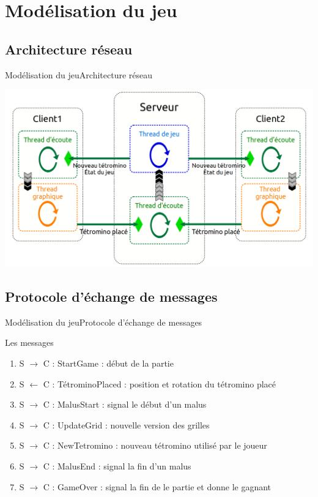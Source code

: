 \documentclass[french]{beamer}
\begin{document}
\section{Modélisation du jeu}
	\subsection{Architecture réseau}

		\begin{frame}{Modélisation du jeu}{Architecture réseau}
			\begin{center}
				\includegraphics[scale=0.25]{img/archi_reseau.png}
			\end{center}
		\end{frame}

	\subsection{Protocole d'échange de messages}

		\begin{frame}{Modélisation du jeu}{Protocole d'échange de messages}
			\begin{block}{Les messages}
				\begin{enumerate}
					\item S $\to$ C : StartGame : début de la partie
					\item S $\gets$ C : TétrominoPlaced : position et rotation du tétromino placé
					\item S $\to$ C : MalusStart : signal le début d'un malus
					\item S $\to$ C : UpdateGrid : nouvelle version des grilles
					\item S $\to$ C : NewTetromino : nouveau tétromino utilisé par le joueur
					\item S $\to$ C : MalusEnd : signal la fin d'un malus
					\item S $\to$ C : GameOver : signal la fin de le partie et donne le gagnant
				\end{enumerate}
			\end{block}
		\end{frame}
\end{document}
